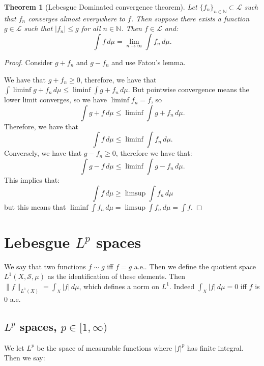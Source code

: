 \documentclass{article}
\newtheorem{theorem}{Theorem}
\theoremstyle{definition}
\numberwithin{theorem}{section}
\numberwithin{equation}{section}
\begin{document}
\begin{theorem}[Lebesgue Dominated convergence theorem]
	Let $\lbrace f_n \rbrace_{n \in \mathbb{N}} \subset \mathcal{L}$ such that $f_n$ converges almost everywhere to $f$. Then suppose there exists a function $g \in \mathcal{L}$ such that $|f_n| \leq g$ for all $n \in \mathbb{N}$. Then $f \in \mathcal{L}$ and:
	\begin{equation}
		\int f \, d\mu = \lim_{n \rightarrow \infty} \int f_n \, d\mu.
	\end{equation}
\end{theorem}
\begin{proof}
	Consider $g + f_n$ and $g - f_n$ and use Fatou's lemma. 
	
	We have that $g + f_n \geq 0$, therefore, we have that $\int \liminf g + f_n \, d\mu \leq \liminf \int g + f_n \, d\mu$. But pointwise convergence means the lower limit converges, so we have $\liminf f_n = f$, so
	\begin{equation}
		 \int g + f \, d\mu \leq \liminf \int g + f_n \, d\mu.
	\end{equation}
	Therefore, we have that
	\begin{equation}
		\int f \, d\mu \leq \liminf \int f_n \, d\mu.
	\end{equation}
	Conversely, we have that $g - f_n \geq 0$, therefore we have that:
	\begin{equation}
		\int g - f \, d\mu \leq \liminf \int g - f_n \, d\mu.
	\end{equation}
	This implies that:
	\begin{equation}
		\int f \, d\mu \geq \limsup \int f_n \, d\mu
	\end{equation}
	but this means that $\liminf \int f_n \, d\mu = \limsup \int f_n \, d\mu = \int f$. 
\end{proof}

\section{Lebesgue $L^p$ spaces}
We say that two functions $f\sim g$ iff $f = g$ a.e.. Then we define the quotient space $L^1(X, \mathcal{S}, \mu)$ as the identification of these elements. Then $\|f \|_{L^1(X)} = \int_X |f| \, d\mu$, which defines a norm on $L^1$. Indeed $\int_X |f| \, d\mu = 0$ iff $f$ is 0 a.e. 

\subsection{$L^p$ spaces, $p \in [1, \infty)$}
We let $L^p$ be the space of measurable functions where $|f|^p$ has finite integral. Then we say:
\end{document}
